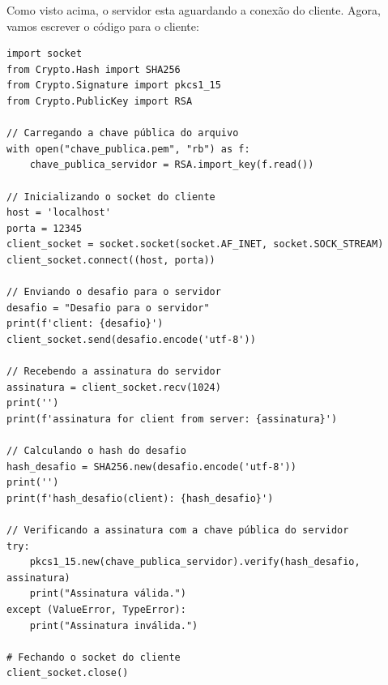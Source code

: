 \documentclass[a4paper,12pt]{article}
\newcommand{\printingbibliography}{%

    \pagestyle{myheadings}
    \markright{}
    \sloppy
    \printbibliography[heading=bibintoc, %
                   title=Refer\^encias %
                  ]
    \fussy%
}
\begin{document}
Como visto acima, o servidor esta aguardando a conex\~ao
do cliente. Agora, vamos escrever o c\'odigo para o cliente:

\begin{listing}[!ht]
\begin{verbatim}
import socket
from Crypto.Hash import SHA256
from Crypto.Signature import pkcs1_15
from Crypto.PublicKey import RSA

// Carregando a chave pública do arquivo
with open("chave_publica.pem", "rb") as f:
    chave_publica_servidor = RSA.import_key(f.read())

// Inicializando o socket do cliente
host = 'localhost'
porta = 12345
client_socket = socket.socket(socket.AF_INET, socket.SOCK_STREAM)
client_socket.connect((host, porta))

// Enviando o desafio para o servidor
desafio = "Desafio para o servidor"
print(f'client: {desafio}')
client_socket.send(desafio.encode('utf-8'))

// Recebendo a assinatura do servidor
assinatura = client_socket.recv(1024)
print('')
print(f'assinatura for client from server: {assinatura}')

// Calculando o hash do desafio
hash_desafio = SHA256.new(desafio.encode('utf-8'))
print('')
print(f'hash_desafio(client): {hash_desafio}')

// Verificando a assinatura com a chave pública do servidor
try:
    pkcs1_15.new(chave_publica_servidor).verify(hash_desafio, assinatura)
    print("Assinatura válida.")
except (ValueError, TypeError):
    print("Assinatura inválida.")

# Fechando o socket do cliente
client_socket.close()

\end{verbatim}
\end{listing}
\printingbibliography
\end{document}
